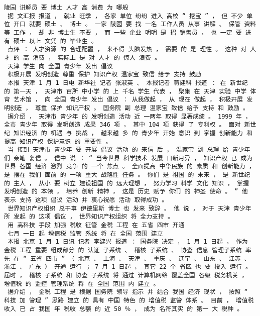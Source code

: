 \documentclass{article}
\begin{document}
\begin{Verbatim}[commandchars=\\\{\}]
 陵园 讲解员 要 博士 人才 高 消费 为 哪般 
 据 文汇报 报道 ， 就业 旺季 ， 各家 单位 纷纷 进入 高校 “ 挖宝 ” ， 但 不少 单位 开口 就要 硕士 、 博士 。 一家 陵园 要 找 一名 工作人员 从事 讲解 、 保管 资料 等 工作 ， 却 非 博士生 不要 ， 而 一些 企业 明明 是 招 销售员 ， 也 一定 要 进有 硕士 以上 文凭 的 毕业生 。 
 点评 ： 人才资源 的 合理配置 ， 来不得 头脑发热 ， 需要 的 是 理性 。 这种 对 人才 的 高 消费 ， 实际上 是 对 人才 的 惊人 浪费 。 
 天津 学生 向 全国 青少年 发出 倡议 
 积极开展 发明创造 尊重 保护 知识产权 温家宝 致信 给予 支持 鼓励 
 本报 天津 1 月 1 日电 新华社 记者 张淑英 、 本报记者 蒋建科 报道 ： 在 新世纪 的 第一天 ， 天津市 百所 中小学 的 上 千名 学生 代表 ， 聚集 在 天津 实验 中学 体育 艺术馆 ， 向 全国 青少年 发出 倡议 ： 从我做起 ， 从 现在 做起 ， 积极开展 发明创造 ， 尊重 保护 知识产权 。 国务院 副 总理 温家宝 致信 给予 支持 和 鼓励 。 
 据介绍 ， 天津市 青少年 的 发明创造 活动 近 一两年 取得 显著成绩 。 1999 年 ， 全市 青少年 取得 发明创造 成果 346 项 ， 其中 104 项 获得 了 专利权 。 面对 新世纪 知识经济 的 机遇 与 挑战 ， 越来越 多 的 青少年 开始 意识 到 掌握 创新能力 和 提高 知识产权 保护意识 的 重要性 。 
 当 接到 天津市 青少年 要 开展 倡议 活动 的 来信 后 ， 温家宝 副 总理 给 青少年 们 亲笔 复信 。 信中 说 ： “ 当今世界 科学技术 发展 日新月异 ， 知识产权 已 成为 世界 各国 经济 激烈 竞争 的 一个 焦点 。 全面提高 中华民族 的 素质 和 创新能力 ， 是 摆在 我们 面前 的 一项 重大 战略性 任务 。 你们 是 祖国 的 未来 ， 是 新世纪 的 主人 ， 从小 要 树立 建设祖国 的 远大理想 ， 努力学习 科学 文化 知识 ， 掌握 发明创造 的 本领 ， 培养 创新 精神 ， 这是 历史 赋予 你们 的 神圣 使命 。 ” 他 表示 支持 这项 倡议 活动 并 衷心祝愿 活动 取得成功 。 
 世界知识产权组织 总干事 伊德里斯 博士 也 发来 致辞 。 他 说 ， 对于 天津 青少年 所 发起 的 这项 倡议 ， 世界知识产权组织 将 全力支持 。 
 用 高科技 手段 加强 税收 征管 金税 工程 在 五省 四市 开通 
 七月 一日 起 增值税 监管 系统 将 在 全国 范围 建立 
 本报 北京 1 月 1 日讯 记者 李建兴 报道 ： 国务院 决定 ， 1 月 1 日起 ， 作为 金税 工程 重要 组成部分 的 认证 子系统 、 稽核 子系统 、 协查 信息 管理子系统 率先 在 “ 五省 四市 ” （ 北京 、 上海 、 天津 、 重庆 、 辽宁 、 山东 、 江苏 、 浙江 、 广东 ） 开通 运行 ； 7 月 1 日起 ， 其它 22 个 省区 也 要 投入 运行 。 届时 ， 稽核 子系统 和 协查 子系统 将 通过 计算机网络 覆盖全国 各级 税务机关 ， 增值税 的 监控 管理系统 将 在 全国 范围 内 建立 。 
 据介绍 ， 金税 工程 是 根据 国务院 领导 指示 并 结合 我国 经济 现状 ， 按照 “ 科技 加 管理 ” 思路 建立 的 具有 中国 特色 的 增值税 监管 体系 。 目前 ， 增值税 收入 已 占 我国 年 税收 总额 的 近 50 ％ ， 成为 名符其实 的 第一 大 税种 。 

\end{Verbatim}
\end{document}
